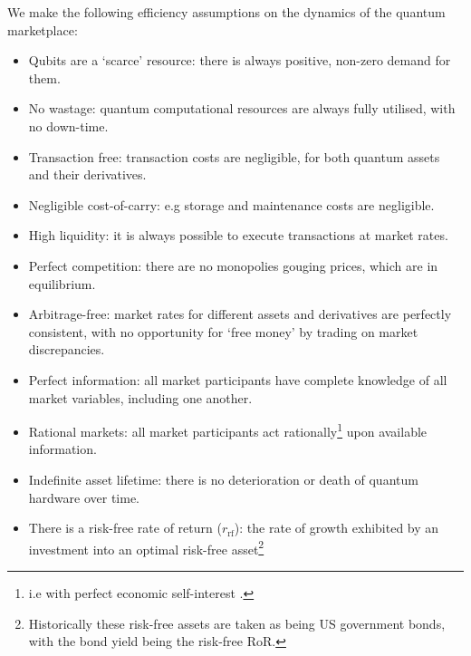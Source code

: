 \begin{postulate}\label{post:market_eff} We make the following efficiency assumptions on the dynamics of the quantum marketplace:
\begin{itemize}
	\item Qubits are a `scarce' resource: there is always positive, non-zero demand for them.
	\item No wastage: quantum computational resources are always fully utilised, with no down-time.
	\item Transaction free: transaction costs are negligible, for both quantum assets and their derivatives.
	\item Negligible cost-of-carry: e.g storage and maintenance costs are negligible.
	\item High liquidity: it is always possible to execute transactions at market rates.
	\item Perfect competition: there are no monopolies gouging prices, which are in equilibrium.
	\item Arbitrage-free: market rates for different assets and derivatives are perfectly consistent, with no opportunity for `free money' by trading on market discrepancies.
	\item Perfect information: all market participants have complete knowledge of all market variables, including one another.
	\item Rational markets: all market participants act rationally\footnote{i.e with perfect economic self-interest .} upon available information.
	\item Indefinite asset lifetime: there is no deterioration or death of quantum hardware over time.
	\item There is a risk-free rate of return ($r_\mathrm{rf}$): the rate of growth exhibited by an investment into an optimal risk-free asset\footnote{Historically these risk-free assets are taken as being US government bonds, with the bond yield being the risk-free RoR.}
	\end{itemize}
\end{postulate}

%
%

